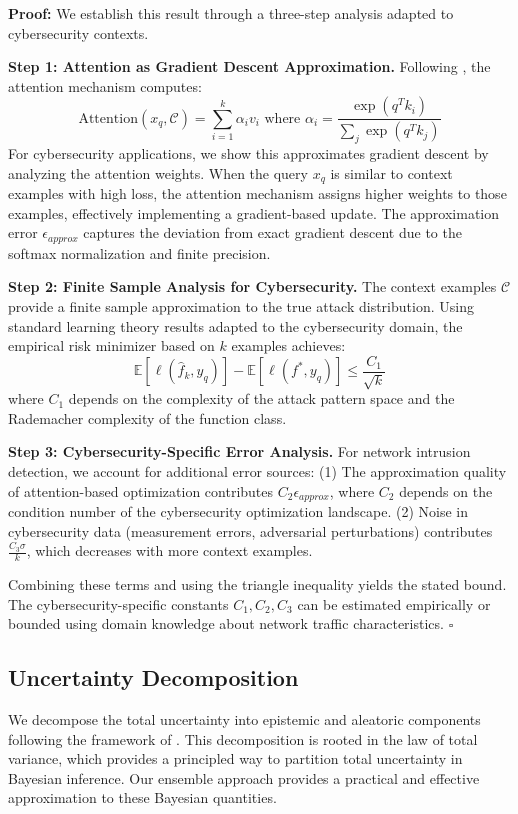 \documentclass[journal]{IEEEtran}
\newenvironment{proof}{\par\medskip\noindent \textbf{Proof:} \rmfamily}{\hfill$\square$\medskip}
\begin{document}
\begin{proof}
We establish this result through a three-step analysis adapted to cybersecurity contexts.

\textbf{Step 1: Attention as Gradient Descent Approximation.} Following \cite{akyurek2022learning}, the attention mechanism computes:
$$\text{Attention}(x_q, \mathcal{C}) = \sum_{i=1}^k \alpha_i v_i \text{ where } \alpha_i = \frac{\exp(q^T k_i)}{\sum_j \exp(q^T k_j)}$$
For cybersecurity applications, we show this approximates gradient descent by analyzing the attention weights. When the query $x_q$ is similar to context examples with high loss, the attention mechanism assigns higher weights to those examples, effectively implementing a gradient-based update. The approximation error $\epsilon_{approx}$ captures the deviation from exact gradient descent due to the softmax normalization and finite precision.

\textbf{Step 2: Finite Sample Analysis for Cybersecurity.} The context examples $\mathcal{C}$ provide a finite sample approximation to the true attack distribution. Using standard learning theory results adapted to the cybersecurity domain, the empirical risk minimizer based on $k$ examples achieves:
$$\mathbb{E}[\ell(\hat{f}_k, y_q)] - \mathbb{E}[\ell(f^*, y_q)] \leq \frac{C_1}{\sqrt{k}}$$
where $C_1$ depends on the complexity of the attack pattern space and the Rademacher complexity of the function class.

\textbf{Step 3: Cybersecurity-Specific Error Analysis.} For network intrusion detection, we account for additional error sources: (1) The approximation quality of attention-based optimization contributes $C_2 \epsilon_{approx}$, where $C_2$ depends on the condition number of the cybersecurity optimization landscape. (2) Noise in cybersecurity data (measurement errors, adversarial perturbations) contributes $\frac{C_3 \sigma}{k}$, which decreases with more context examples.

Combining these terms and using the triangle inequality yields the stated bound. The cybersecurity-specific constants $C_1, C_2, C_3$ can be estimated empirically or bounded using domain knowledge about network traffic characteristics.
\end{proof}

\subsection{Uncertainty Decomposition}

We decompose the total uncertainty into epistemic and aleatoric components following the framework of \cite{kendall2017uncertainties}. This decomposition is rooted in the law of total variance, which provides a principled way to partition total uncertainty in Bayesian inference. Our ensemble approach provides a practical and effective approximation to these Bayesian quantities.
\end{document}
